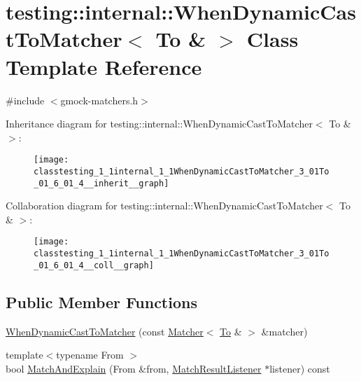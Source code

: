 \hypertarget{classtesting_1_1internal_1_1WhenDynamicCastToMatcher_3_01To_01_6_01_4}{}\section{testing\+:\+:internal\+:\+:When\+Dynamic\+Cast\+To\+Matcher$<$ To \& $>$ Class Template Reference}
\label{classtesting_1_1internal_1_1WhenDynamicCastToMatcher_3_01To_01_6_01_4}


{\ttfamily \#include $<$gmock-\/matchers.\+h$>$}



Inheritance diagram for testing\+:\+:internal\+:\+:When\+Dynamic\+Cast\+To\+Matcher$<$ To \& $>$\+:
\nopagebreak
\begin{figure}[H]
\begin{center}
\leavevmode
\texttt{[image: classtesting\_1\_1internal\_1\_1WhenDynamicCastToMatcher\_3\_01To\_01\_6\_01\_4\_\_inherit\_\_graph]}
\end{center}
\end{figure}


Collaboration diagram for testing\+:\+:internal\+:\+:When\+Dynamic\+Cast\+To\+Matcher$<$ To \& $>$\+:
\nopagebreak
\begin{figure}[H]
\begin{center}
\leavevmode
\texttt{[image: classtesting\_1\_1internal\_1\_1WhenDynamicCastToMatcher\_3\_01To\_01\_6\_01\_4\_\_coll\_\_graph]}
\end{center}
\end{figure}
\subsection*{Public Member Functions}
\begin{DoxyCompactItemize}
\item 
\hyperlink{classtesting_1_1internal_1_1WhenDynamicCastToMatcher_3_01To_01_6_01_4_a5f292f9497d2da8484082cba38053908}{When\+Dynamic\+Cast\+To\+Matcher} (const \hyperlink{classtesting_1_1Matcher}{Matcher}$<$ \hyperlink{classtesting_1_1internal_1_1To}{To} \& $>$ \&matcher)
\item 
{\footnotesize template$<$typename From $>$ }\\bool \hyperlink{classtesting_1_1internal_1_1WhenDynamicCastToMatcher_3_01To_01_6_01_4_a5459ff45c7b687d42545490226c2f7b2}{Match\+And\+Explain} (From \&from, \hyperlink{classtesting_1_1MatchResultListener}{Match\+Result\+Listener} $\ast$listener) const 
\end{DoxyCompactItemize}
